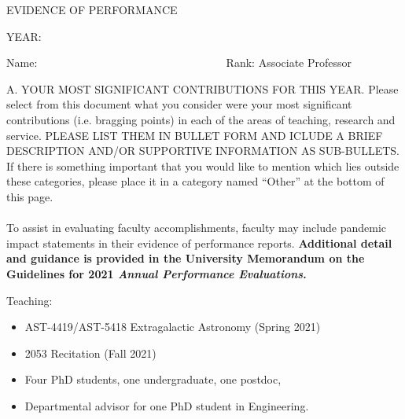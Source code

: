 \addtolength{\topmargin}{-.5in}
\addtolength{\textheight}{2.5cm}
\addtolength{\oddsidemargin}{-.75in}
\addtolength{\evensidemargin}{-.75in}
\addtolength{\textwidth}{.5in}


\centerline{EVIDENCE OF PERFORMANCE}
\bigskip
\centerline{YEAR: }
\bigskip
\noindent Name: 
\hbox{\ \ \ \ \ \ \ \
\ \ \ \ \ \ \ \ \ \ \ \ \ \ \ \ \ \ \ \ \ \ \ \ \ }
Rank: \underbar
{Associate Professor }

\vskip 20pt

\noindent A. YOUR MOST SIGNIFICANT CONTRIBUTIONS FOR THIS YEAR.
Please select from this document what you consider were your most
significant contributions (i.e. bragging points) in each of the areas of teaching, research
and service. PLEASE LIST THEM IN BULLET FORM AND ICLUDE A BRIEF 
DESCRIPTION AND/OR SUPPORTIVE INFORMATION AS SUB-BULLETS. 
If there is something important that you would like to mention which
lies outside these categories, please
place it in a category named ``Other'' at the bottom of this page. \\ \\

To assist in evaluating faculty accomplishments, faculty may include pandemic impact statements in their evidence of performance reports.  \textbf {Additional detail and guidance is provided in the University Memorandum on the Guidelines for 2021 \textit{Annual Performance Evaluations}.}


\vskip 10pt
\noindent
Teaching:
\begin{itemize}
	\item AST-4419/AST-5418 Extragalactic Astronomy (Spring 2021)
	\item 2053 Recitation (Fall 2021)
	\item Four PhD students, one undergraduate, one postdoc, 
    \item Departmental advisor for one PhD student in
        Engineering.
\end{itemize}
\vskip 30pt

